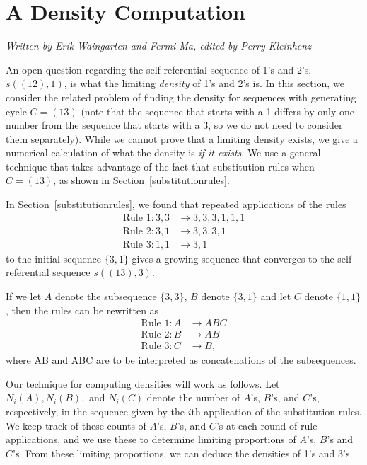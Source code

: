 \documentclass[runningheads,a4paper]{llncs}
\begin{document}
\section{A Density Computation}
\label{densitycomputation}
\emph{Written by Erik Waingarten and Fermi Ma, edited by Perry Kleinhenz}

An open question regarding the self-referential sequence of 1's and 2's, $s((1 2),1)$, is what the limiting \emph{density} of 1's and 2's is. In this section, we consider the related problem of finding the density for sequences with generating cycle $C = (1 3)$ (note that the sequence that starts with a 1 differs by only one number from the sequence that starts with a 3, so we do not need to consider them separately). While we cannot prove that a limiting density exists, we give a numerical calculation of what the density is \emph{if it exists}. We use a general technique that takes advantage of the fact that substitution rules when $C = (1 3)$, as shown in Section~\ref{substitutionrules}.

In Section~\ref{substitutionrules}, we found that repeated applications of the rules
\begin{align*}
\text{Rule }1: 3,3 &\to 3,3,3,1,1,1 \\
\text{Rule }2: 3,1 &\to 3,3,3,1\\
\text{Rule }3: 1,1 &\to 3,1
\end{align*}
to the initial sequence $\{3,1\}$ gives a growing sequence that converges to the self-referential sequence $s((1 3),3)$. 

If we let $A$ denote the subsequence $\{3,3\}$, $B$ denote $\{3,1\}$ and let $C$ denote $\{1,1\}$, then the rules can be rewritten as
\begin{align*}
\text{Rule }1: A &\to ABC \\
\text{Rule }2: B &\to AB\\
\text{Rule }3: C &\to B,
\end{align*}
where AB and ABC are to be interpreted as concatenations of the subsequences.

Our technique for computing densities will work as follows. Let $N_i(A), N_i(B),$ and $N_i(C)$ denote the number of $A$'s, $B$'s, and $C$'s, respectively, in the sequence given by the $i$th application of the substitution rules. We keep track of these counts of $A$'s, $B$'s, and $C$'s at each round of rule applications, and we use these to determine limiting proportions of $A$'s, $B$'s and $C$'s. From these limiting proportions, we can deduce the densities of 1's and 3's. 
\end{document}
